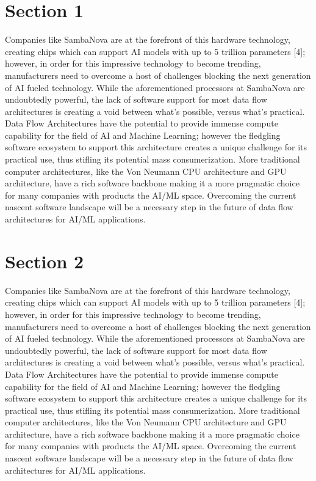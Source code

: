\documentclass[11pt]{IEEEtran}
\begin{document}
\onecolumn

\singlespacing


\doublespacing


\clearpage
{}

\clearpage
\section{Section 1}
Companies like SambaNova are at the forefront of this hardware technology, creating chips which can support AI models with up to 5 trillion parameters [4]; however, in order for this impressive technology to become trending, manufacturers need to overcome a host of challenges blocking the next generation of AI fueled technology.  While the aforementioned processors at SambaNova are undoubtedly powerful, the lack of software support for most data flow architectures is creating a void between what's possible, versus what's practical.  Data Flow Architectures have the potential to provide immense compute capability for the field of AI and Machine Learning; however the fledgling software ecosystem to support this architecture creates a unique challenge for its practical use, thus stifling its potential mass consumerization.  More traditional computer architectures, like the Von Neumann CPU architecture and GPU architecture, have a rich software backbone making it a more pragmatic choice for many companies with products the AI/ML space.  Overcoming the current nascent software landscape will be a necessary step in the future of data flow architectures for AI/ML applications. 

\section{Section 2}
Companies like SambaNova are at the forefront of this hardware technology, creating chips which can support AI models with up to 5 trillion parameters [4]; however, in order for this impressive technology to become trending, manufacturers need to overcome a host of challenges blocking the next generation of AI fueled technology.  While the aforementioned processors at SambaNova are undoubtedly powerful, the lack of software support for most data flow architectures is creating a void between what's possible, versus what's practical.  Data Flow Architectures have the potential to provide immense compute capability for the field of AI and Machine Learning; however the fledgling software ecosystem to support this architecture creates a unique challenge for its practical use, thus stifling its potential mass consumerization.  More traditional computer architectures, like the Von Neumann CPU architecture and GPU architecture, have a rich software backbone making it a more pragmatic choice for many companies with products the AI/ML space.  Overcoming the current nascent software landscape will be a necessary step in the future of data flow architectures for AI/ML applications. 
\end{document}
